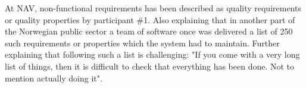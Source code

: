 
At NAV, non-functional requirements has been described as quality requirements or quality properties by participant \#1. Also explaining that in another part of the Norwegian public sector a team of software once was delivered a list of 250 such requirements or properties which the system had to maintain. Further explaining that following such a list is challenging: "If you come with a very long list of things, then it is difficult to check that everything has been done. Not to mention actually doing it". 





